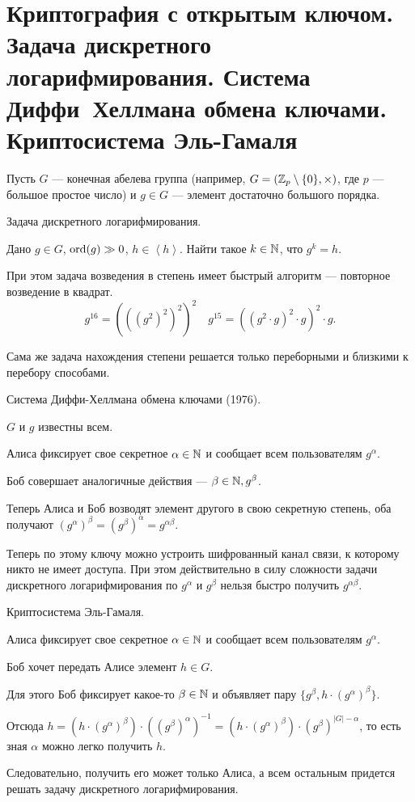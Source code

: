 \section{Криптография с открытым ключом. Задача дискретного логарифмирования. Система Диффи~Хеллмана обмена ключами. Криптосистема Эль-Гамаля}

Пусть $G$ --- конечная абелева группа (например, $G = (\mathbb{Z}_p \setminus \{0\}, \times)$, где $p$ --- большое простое число) и $g \in G$ --- элемент достаточно большого порядка.

\begin{problem}
    Задача дискретного логарифмирования.

    Дано $g \in G$, $\operatorname{\mathop{\mathrm{ord}}}(g) \gg 0$, $h \in \left< h \right>$. Найти такое $k \in \mathbb{N}$, что $g^{k} = h$.

    При этом задача возведения в степень имеет быстрый алгоритм --- повторное возведение в квадрат.
    \begin{equation*}
        g^{16} = \left(\left(\left(g^2\right)^2\right)^2\right)^2 \quad 
        g^{15} = \left(\left(g^2 \cdot g\right)^2 \cdot g\right)^2 \cdot g
    .\end{equation*}

    Сама же задача нахождения степени решается только переборными и близкими к перебору способами.
\end{problem}

\begin{problem}
    Система Диффи-Хеллмана обмена ключами (1976).

    $G$ и $g$ известны всем.

    Алиса фиксирует свое секретное $\alpha \in \mathbb{N}$ и сообщает всем пользователям $g^{\alpha}$.

    Боб совершает аналогичные действия --- $\beta \in \mathbb{N}, g^{\beta}$.

    Теперь Алиса и Боб возводят элемент другого в свою секретную степень, оба получают $(g^{\alpha})^{\beta} = \left(g^{\beta}\right)^{\alpha} = g^{\alpha\beta}$.

    Теперь по этому ключу можно устроить шифрованный канал связи, к которому никто не имеет доступа. При этом действительно в силу сложности задачи дискретного логарифмирования по $g^{\alpha}$ и $g^{\beta}$ нельзя быстро получить $g^{\alpha\beta}$.
\end{problem}

\begin{problem}
    Криптосистема Эль-Гамаля.

    Алиса фиксирует свое секретное $\alpha \in \mathbb{N}$ и сообщает всем пользователям $g^{\alpha}$.

    Боб хочет передать Алисе элемент $h \in G$.

    Для этого Боб фиксирует какое-то $\beta \in \mathbb{N}$ и объявляет пару $ \{g^{\beta}, h \cdot (g^{\alpha})^{\beta}\}$.

    Отсюда $h = \left(h \cdot (g^{\alpha})^{\beta}\right) \cdot ((g^{\beta})^{\alpha})^{-1} = (h \cdot (g^{\alpha})^{\beta}) \cdot (g^{\beta})^{|G|-\alpha}$, то есть зная $\alpha$ можно легко получить $h$.

    Следовательно, получить его может только Алиса, а всем остальным придется решать задачу дискретного логарифмирования.
\end{problem}
